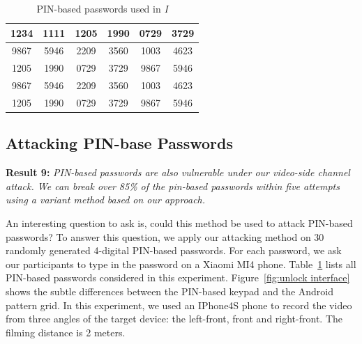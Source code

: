     \begin{table}[!t]
            \centering
            \caption{PIN-based passwords used in \emph{I}}
            \label{tab:PIN-based passwords}
            \begin{tabular}{cccccc}
                \toprule
                1234 & 1111 & 1205 & 1990 & 0729 & 3729 \\
                \midrule
                9867 & 5946 & 2209 & 3560 & 1003 & 4623  \\
                \midrule
                1205 & 1990 & 0729 & 3729 & 9867 & 5946  \\
                \midrule
                9867 & 5946 & 2209 & 3560 & 1003 & 4623  \\
                \midrule
                1205 & 1990 & 0729 & 3729 & 9867 & 5946  \\
                \bottomrule
            \end{tabular}
    \end{table}

    \subsection{Attacking PIN-base Passwords}
        \noindent \textbf{Result 9:} \emph{PIN-based passwords are also
        vulnerable under our video-side channel attack. We can break
        over 85\% of the pin-based passwords within five attempts using a
        variant method based on our approach.}

        An interesting question to ask is, could this method be used to
        attack PIN-based passwords? To answer this question, we apply our
        attacking method on 30 randomly generated 4-digital PIN-based
        passwords. For each password, we ask our participants to type in the
        password on a Xiaomi MI4 phone. Table~\ref{tab:PIN-based passwords}
        lists all PIN-based passwords considered in this experiment. Figure~\ref{fig:unlock interface}
        shows the subtle differences between the PIN-based keypad and the
        Android pattern grid. In this experiment, we used an IPhone4S phone
        to record the video from three angles of the target device: the
        left-front, front and right-front. The filming distance is 2 meters.

